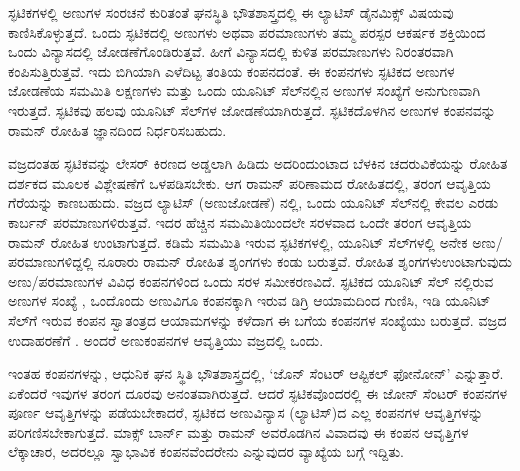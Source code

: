 
ಸ್ಫಟಿಕಗಳಲ್ಲಿ ಅಣುಗಳ ಸಂರಚನೆ ಕುರಿತಂತೆ ಘನಸ್ಥಿತಿ ಭೌತಶಾಸ್ತ್ರದಲ್ಲಿ ಈ ಲ್ಯಾಟಿಸ್ ಡೈನಮಿಕ್ಸ್ ವಿಷಯವು ಕಾಣಿಸಿಕೊಳ್ಳುತ್ತದೆ. ಒಂದು ಸ್ಫಟಿಕದಲ್ಲಿ ಅಣುಗಳು ಅಥವಾ ಪರಮಾಣುಗಳು ತಮ್ಮ ಪರಸ್ಪರ ಆಕರ್ಷಕ ಶಕ್ತಿಯಿಂದ ಒಂದು ವಿನ್ಯಾಸದಲ್ಲಿ ಜೋಡಣೆಗೊಂಡಿರುತ್ತವೆ. ಹೀಗೆ ವಿನ್ಯಾಸದಲ್ಲಿ ಕುಳಿತ ಪರಮಾಣುಗಳು ನಿರಂತರವಾಗಿ ಕಂಪಿಸುತ್ತಿರುತ್ತವೆ. ಇದು ಬಿಗಿಯಾಗಿ ಎಳೆದಿಟ್ಟ ತಂತಿಯ ಕಂಪನದಂತೆ. ಈ ಕಂಪನಗಳು ಸ್ಫಟಿಕದ ಅಣುಗಳ ಜೋಡಣೆಯ ಸಮಮಿತಿ ಲಕ್ಷಣಗಳು ಮತ್ತು ಒಂದು ಯೂನಿಟ್ ಸೆಲ್‍ನಲ್ಲಿನ ಅಣುಗಳ ಸಂಖ್ಯೆಗೆ ಅನುಗುಣವಾಗಿ ಇರುತ್ತದೆ. ಸ್ಫಟಿಕವು ಹಲವು ಯೂನಿಟ್ ಸೆಲ್‍ಗಳ ಜೋಡಣೆಯಾಗಿರುತ್ತದೆ. ಸ್ಫಟಿಕದೊಳಗಿನ ಅಣುಗಳ ಕಂಪನವನ್ನು ರಾಮನ್ ರೋಹಿತ  ಜ್ಞಾನದಿಂದ ನಿರ್ಧರಿಸಬಹುದು.

ವಜ್ರದಂತಹ ಸ್ಫಟಿಕವನ್ನು ಲೇಸರ್ ಕಿರಣದ ಅಡ್ಡಲಾಗಿ ಹಿಡಿದು ಅದರಿಂದುಂಟಾದ ಬೆಳಕಿನ ಚದರುವಿಕೆಯನ್ನು ರೋಹಿತ ದರ್ಶಕದ ಮೂಲಕ ವಿಶ್ಲೇಷಣೆಗೆ ಒಳಪಡಿಸಬೇಕು. ಆಗ ರಾಮನ್ ಪರಿಣಾಮದ ರೋಹಿತದಲ್ಲಿ,  ತರಂಗ ಆವೃತ್ತಿಯ ಗೆರೆಯನ್ನು ಕಾಣಬಹುದು. ವಜ್ರದ ಲ್ಯಾಟಿಸ್ (ಅಣುಜೋಡಣೆ) ನಲ್ಲಿ, ಒಂದು ಯೂನಿಟ್ ಸೆಲ್‍ನಲ್ಲಿ ಕೇವಲ ಎರಡು ಕಾರ್ಬನ್ ಪರಮಾಣುಗಳಿರುತ್ತವೆ. ಇದರ ಹೆಚ್ಚಿನ ಸಮಮಿತಿಯಿಂದಲೇ ಸರಳವಾದ ಒಂದೇ ತರಂಗ ಆವೃತ್ತಿಯ ರಾಮನ್ ರೋಹಿತ  ಉಂಟಾಗುತ್ತದೆ. ಕಡಿಮೆ ಸಮಮಿತಿ ಇರುವ ಸ್ಫಟಿಕಗಳಲ್ಲಿ, ಯೂನಿಟ್ ಸೆಲ್‍ಗಳಲ್ಲಿ ಅನೇಕ ಅಣು/ಪರಮಾಣುಗಳಿದ್ದಲ್ಲಿ ನೂರಾರು ರಾಮನ್ ರೋಹಿತ  ಶೃಂಗಗಳು ಕಂಡು ಬರುತ್ತವೆ. ರೋಹಿತ ಶೃಂಗಗಳು\break ಉಂಟಾಗುವುದು ಅಣು/ಪರಮಾಣುಗಳ ವಿವಿಧ ಕಂಪನಗಳಿಂದ ಒಂದು ಸರಳ ಸಮೀಕರಣವಿದೆ. ಸ್ಫಟಿಕದ ಯೂನಿಟ್ ಸೆಲ್ ನಲ್ಲಿರುವ ಅಣುಗಳ ಸಂಖ್ಯೆ , ಒಂದೊಂದು ಅಣುವಿಗೂ ಕಂಪನಕ್ಕಾಗಿ ಇರುವ  ಡಿಗ್ರಿ ಆಯಾಮದಿಂದ ಗುಣಿಸಿ, ಇಡಿ ಯೂನಿಟ್ ಸೆಲ್‍ಗೆ ಇರುವ ಕಂಪನ ಸ್ವಾತಂತ್ರದ ಆಯಾಮಗಳನ್ನು ಕಳೆದಾಗ \enginline{-} ಈ ಬಗೆಯ ಕಂಪನಗಳ ಸಂಖ್ಯೆಯು ಬರುತ್ತದೆ. ವಜ್ರದ ಉದಾಹರಣೆಗೆ . ಅಂದರೆ  ಅಣುಕಂಪನಗಳ ಆವೃತ್ತಿಯು ವಜ್ರದಲ್ಲಿ ಒಂದು.

\newpage

ಇಂತಹ ಕಂಪನಗಳನ್ನು, ಆಧುನಿಕ ಘನ ಸ್ಥಿತಿ ಭೌತಶಾಸ್ತ್ರದಲ್ಲಿ, ‘ಜೊನ್ ಸೆಂಟರ್ ಆಪ್ಟಿಕಲ್ ಫೋನೋನ್’ ಎನ್ನುತ್ತಾರೆ. ಏಕೆಂದರೆ ಇವುಗಳ ತರಂಗ ದೂರವು ಅನಂತವಾಗಿರುತ್ತದೆ. ಆದರೆ ಸ್ಫಟಿಕವೊಂದರಲ್ಲಿ ಈ ಜೋನ್ ಸೆಂಟರ್ ಕಂಪನಗಳ ಪೂರ್ಣ ಆವೃತ್ತಿಗಳನ್ನು ಪಡೆಯಬೇಕಾದರೆ, ಸ್ಫಟಿಕದ ಅಣುವಿನ್ಯಾಸ (ಲ್ಯಾಟಿಸ್)ದ ಎಲ್ಲ ಕಂಪನಗಳ ಆವೃತ್ತಿಗಳನ್ನು ಪರಿಗಣಿಸಬೇಕಾಗುತ್ತದೆ. ಮಾಕ್ಸ್ ಬಾರ್ನ್ ಮತ್ತು ರಾಮನ್ ಅವರೊಡಗಿನ ವಿವಾದವು ಈ ಕಂಪನ ಆವೃತ್ತಿಗಳ ಲೆಕ್ಕಾಚಾರ, ಅದರಲ್ಲೂ ಸ್ವಾಭಾವಿಕ ಕಂಪನವೆಂದರೇನು ಎನ್ನುವುದರ ವ್ಯಾಖ್ಯೆಯ ಬಗ್ಗೆ ಇದ್ದಿತು.

